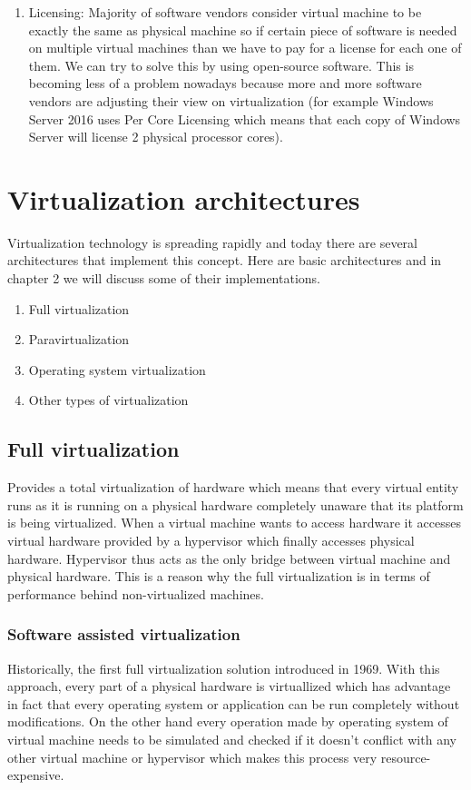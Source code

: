 \begin{enumerate}
\item Licensing: Majority of software vendors consider virtual machine to be exactly the same as physical machine so if certain piece of software is needed on multiple virtual machines than we have to pay for a license for each one of them. We can try to solve this by using open-source software. This is becoming less of a problem nowadays because more and more software vendors are adjusting their view on virtualization (for example Windows Server 2016 uses Per Core Licensing which means that each copy of Windows Server will license 2 physical processor cores).
\end{enumerate}

\section{Virtualization architectures}
Virtualization technology is spreading rapidly and today there are several architectures that implement this concept. Here are basic architectures and in chapter 2 we will discuss some of their implementations.
\begin{enumerate}
\item Full virtualization
\item Paravirtualization
\item Operating system virtualization
\item Other types of virtualization
\end{enumerate}

\subsection{Full virtualization} \label{full_virt}
Provides a total virtualization of hardware which means that every virtual entity runs as it is running on a physical hardware completely unaware that its platform is being virtualized. When a virtual machine wants to access hardware it accesses virtual hardware provided by a hypervisor which finally accesses physical hardware. Hypervisor thus acts as the only bridge between virtual machine and physical hardware. This is a reason why the full virtualization is in terms of performance behind non-virtualized machines.
\subsubsection{Software assisted virtualization}
Historically, the first full virtualization solution introduced in 1969. With this approach, every part of a physical hardware is virtuallized which has advantage in fact that every operating system or application can be run completely without modifications. On the other hand every operation made by operating system of virtual machine needs to be simulated and checked if it doesn't conflict with any other virtual machine or hypervisor which makes this process very resource-expensive.

